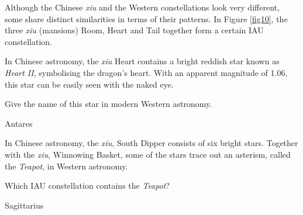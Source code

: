 \documentclass[a4paper,11pt,draft]{exam}
\begin{document}
\begin{questions}
{\vspace*{-10pt}}	
\question\label{5f}
	Although the Chinese \textit{xiu} and the Western constellations look very different, some share distinct similarities in terms of their patterns. In Figure \ref{fig10}, the three \textit{xiu} (mansions) Room, Heart and Tail together form a certain IAU constellation. 

\question[1]
	In Chinese astronomy, the \textit{xiu} Heart contains a bright reddish star known as \textit{Heart II}, symbolising the dragon’s heart. With an apparent magnitude of 1.06, this star can be easily seen with the naked eye. 
	
	Give the name of this star in modern Western astronomy.
	\droppoints
	\begin{solution}
		Antares
	\end{solution}
	
\question[1]\label{5h}
	In Chinese astronomy, the \textit{xiu}, South Dipper consists of six bright stars. Together with the \textit{xiu}, Winnowing Basket, some of the stars trace out an asterism, called the \textit{Teapot}, in Western astronomy. 
	
	Which IAU constellation contains the \textit{Teapot}?
	\droppoints
	\begin{solution}
		Sagittarius
	\end{solution}


\end{questions}
\end{document}
